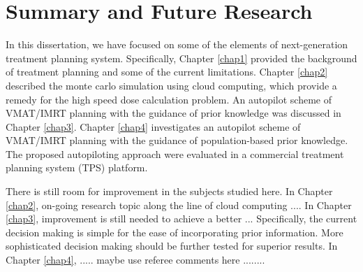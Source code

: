 \chapter{Summary and Future Research} \label{cha:chap5}

In this dissertation, we have focused on some of the elements of next-generation treatment planning system. Specifically, Chapter \ref{chap1} provided the background of treatment planning and some of the current limitations. Chapter \ref{chap2} described the monte carlo simulation using cloud computing, which provide a remedy for the high speed dose calculation problem. An autopilot scheme of VMAT/IMRT planning with the guidance of prior knowledge was discussed in Chapter \ref{chap3}. Chapter \ref{chap4} investigates an autopilot scheme of VMAT/IMRT planning with the guidance of population-based prior knowledge.  The proposed autopiloting approach were evaluated in a commercial treatment planning system (TPS) platform. 

There is still room for improvement in the subjects studied here. In Chapter \ref{chap2}, on-going research topic along the line of cloud computing  .... In Chapter \ref{chap3}, improvement is still needed to achieve a better ... Specifically, the current decision making is simple for the ease of incorporating prior information. More sophisticated decision making should be further tested for superior results. In Chapter \ref{chap4}, ..... maybe use referee comments here ........